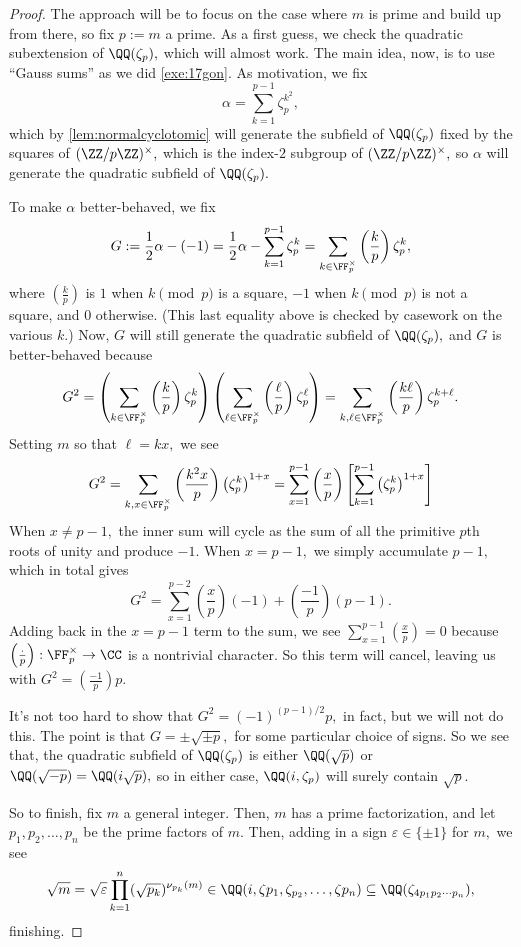 \begin{proof}
	The approach will be to focus on the case where $m$ is prime and build up from there, so fix $p:=m$ a prime. As a first guess, we check the quadratic subextension of $\QQ(\zeta_p),$ which will almost work. The main idea, now, is to use ``Gauss sums'' as we did \autoref{exe:17gon}. As motivation, we fix
	\[\alpha=\sum_{k=1}^{p-1}\zeta_p^{k^2},\]
	which by \autoref{lem:normalcyclotomic} will generate the subfield of $\QQ(\zeta_p)$ fixed by the squares of $(\ZZ/p\ZZ)^\times,$ which is the index-$2$ subgroup of $(\ZZ/p\ZZ)^\times,$ so $\alpha$ will generate the quadratic subfield of $\QQ(\zeta_p).$
	
	To make $\alpha$ better-behaved, we fix
	\[G:=\frac12\alpha-(-1)=\frac12\alpha-\sum_{k=1}^{p-1}\zeta_p^k=\sum_{k\in\FF_p^\times}\left(\frac kp\right)\zeta_p^k,\]
	where $\left(\frac kp\right)$ is $1$ when $k\pmod p$ is a square, $-1$ when $k\pmod p$ is not a square, and $0$ otherwise. (This last equality above is checked by casework on the various $k.$) Now, $G$ will still generate the quadratic subfield of $\QQ(\zeta_p),$ and $G$ is better-behaved because
	\[G^2=\left(\sum_{k\in\FF_p^\times}\left(\frac kp\right)\zeta_p^k\right)\left(\sum_{\ell\in\FF_p^\times}\left(\frac\ell p\right)\zeta_p^\ell\right)=\sum_{k,\ell\in\FF_p^\times}\left(\frac{k\ell}p\right)\zeta_p^{k+\ell}.\]
	Setting $m$ so that $\ell=kx,$ we see
	\[G^2=\sum_{k,x\in\FF_p^\times}\left(\frac{k^2x}p\right)\left(\zeta_p^k\right)^{1+x}=\sum_{x=1}^{p-1}\left(\frac xp\right)\left[\sum_{k=1}^{p-1}\left(\zeta_p^k\right)^{1+x}\right]\]
	When $x\ne p-1,$ the inner sum will cycle as the sum of all the primitive $p$th roots of unity and produce $-1.$ When $x=p-1,$ we simply accumulate $p-1,$ which in total gives
	\[G^2=\sum_{x=1}^{p-2}\left(\frac xp\right)(-1)+\left(\frac{-1}p\right)(p-1).\]
	Adding back in the $x=p-1$ term to the sum, we see $\sum_{x=1}^{p-1}\left(\frac xp\right)=0$ because $\left(\frac{\cdot}p\right):\FF_p^\times\to\CC$ is a nontrivial character. So this term will cancel, leaving us with $G^2=\left(\frac{-1}p\right)p.$

	It's not too hard to show that $G^2=(-1)^{(p-1)/2}p,$ in fact, but we will not do this. The point is that $G=\pm\sqrt{\pm p},$ for some particular choice of signs. So we see that, the quadratic subfield of $\QQ(\zeta_p)$ is either $\QQ(\sqrt p)$ or $\QQ(\sqrt{-p})=\QQ(i\sqrt p),$ so in either case, $\QQ(i,\zeta_p)$ will surely contain $\sqrt p.$

	So to finish, fix $m$ a general integer. Then, $m$ has a prime factorization, and let $p_1,p_2,\ldots,p_n$ be the prime factors of $m.$ Then, adding in a sign $\varepsilon\in\{\pm1\}$ for $m,$ we see
	\[\sqrt m=\sqrt\varepsilon\prod_{k=1}^n(\sqrt{p_k})^{\nu_{p_k}(m)}\in\QQ(i,\zeta{p_1},\zeta_{p_2},\ldots,\zeta{p_n})\subseteq\QQ(\zeta_{4p_1p_2\cdots p_n}),\]
	finishing.
\end{proof}
